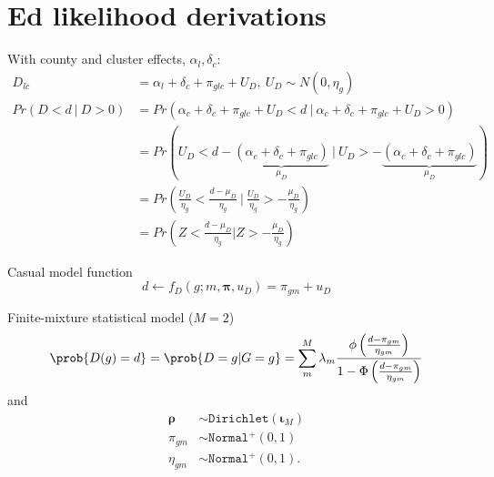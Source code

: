 \documentclass{article}
\begin{document}
    

\section*{Ed likelihood derivations}

With county and cluster effects, $\alpha_l, \delta_c$:
\begin{align*}
  D_{lc} &= \alpha_l + \delta_c + \pi_{glc} + U_D, \ U_D \sim N(0, \eta_g) \\
  Pr(D < d \ |\  D > 0 ) &= Pr(\alpha_c + \delta_c + \pi_{glc} + U_D < d \ | \ 
  \alpha_c + \delta_c + \pi_{glc} + U_D > 0) \\
   &= Pr( U_D < d -  \underbrace{(\alpha_c + \delta_c + \pi_{glc})}_{\mu_D}\   |\  
    U_D > - \underbrace{(\alpha_c + \delta_c + \pi_{glc})}_{\mu_D}) \\ 
   &= Pr\left( \frac{U_D}{\eta_g} <  \frac{d - \mu_D}{\eta_g} \   |\  
    \frac{U_D}{\eta_g} > - \frac{\mu_D}{\eta_g}\right) \\  
    &= Pr(Z < \frac{d - \mu_D}{\eta_g} | Z > -\frac{\mu_D}{\eta_g} )
\end{align*}







 Casual model function 
 \begin{equation*}  
   d \leftarrow f_D(g; m, \boldsymbol{\pi}, u_D) = \pi_{gm} + u_D 
 \end{equation*} 


 Finite-mixture statistical model ($M = 2$) 
 \begin{align*} 
 \prob{D(g) = d} = \prob{D = g | G = g} = \sum_m^M \lambda_m \frac{\phi\left(\frac{d - \pi_{gm}}{\eta_{gm}}\right)}{1 - \Phi\left(\frac{d - \pi_{gm}}{\eta_{gm}}\right)}  
 \end{align*} 
 and 
 \begin{align*} 
   \boldsymbol{\rho} &\sim \mathtt{Dirichlet}(\boldsymbol{\iota}_M) \\ 
   \pi_{gm} &\sim \mathtt{Normal^+}(0, 1) \\ 
   \eta_{gm} &\sim \mathtt{Normal^+}(0, 1). 
 \end{align*} 
\end{document}
